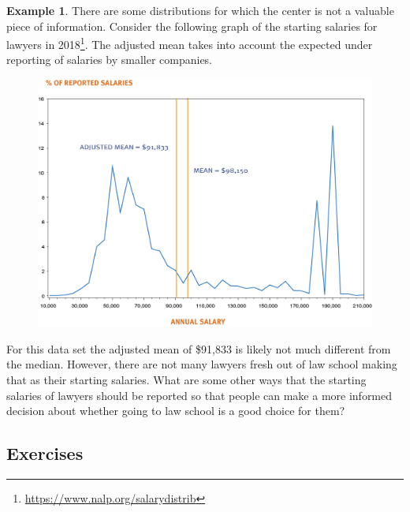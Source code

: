 \documentclass[
]{book}
\theoremstyle{definition}
\theoremstyle{definition}
\newtheorem{example}{Example}[chapter]
\theoremstyle{definition}
\theoremstyle{definition}
\theoremstyle{remark}
\begin{document}
\begin{example}
There are some distributions for which the center is not a valuable piece of information. Consider the following graph of the starting salaries for lawyers in 2018\footnote{\url{https://www.nalp.org/salarydistrib}}. The adjusted mean takes into account the expected under reporting of salaries by smaller companies.

\begin{figure}

{\centering \includegraphics[width=0.7\linewidth]{images/Lawyer_starting_salaries} 

}

\end{figure}

For this data set the adjusted mean of \$91,833 is likely not much different from the median. However, there are not many lawyers fresh out of law school making that as their starting salaries. What are some other ways that the starting salaries of lawyers should be reported so that people can make a more informed decision about whether going to law school is a good choice for them?
\end{example}

\hypertarget{exercises-62}{%
\subsection{Exercises}\label{exercises-62}}
\end{document}
